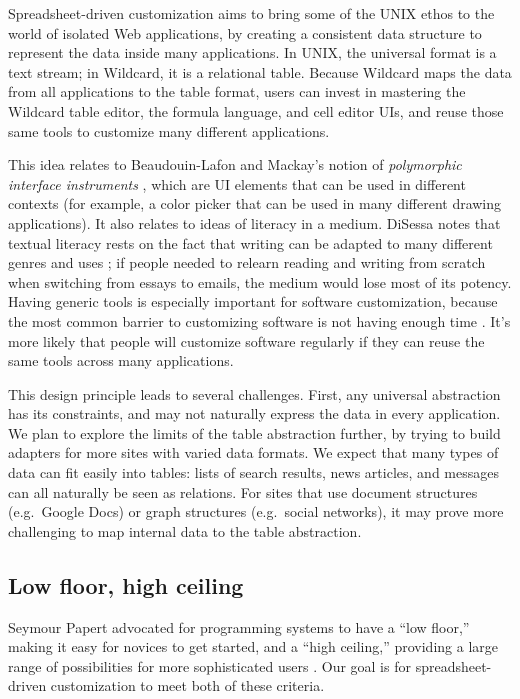 \documentclass[english,submission]{programming}
\begin{document}
Spreadsheet-driven customization aims to bring some of the UNIX ethos to
the world of isolated Web applications, by creating a consistent data
structure to represent the data inside many applications. In UNIX, the
universal format is a text stream; in Wildcard, it is a relational
table. Because Wildcard maps the data from all applications to the table
format, users can invest in mastering the Wildcard table editor, the
formula language, and cell editor UIs, and reuse those same tools to
customize many different applications.

This idea relates to Beaudouin-Lafon and Mackay's notion of
\emph{polymorphic interface instruments} \autocite{beaudouin-lafon2000},
which are UI elements that can be used in different contexts (for
example, a color picker that can be used in many different drawing
applications). It also relates to ideas of literacy in a medium. DiSessa
notes that textual literacy rests on the fact that writing can be
adapted to many different genres and uses \autocite{disessa2000}; if
people needed to relearn reading and writing from scratch when switching
from essays to emails, the medium would lose most of its potency. Having
generic tools is especially important for software customization,
because the most common barrier to customizing software is not having
enough time \autocite{mackay1991}. It's more likely that people will
customize software regularly if they can reuse the same tools across
many applications.

This design principle leads to several challenges. First, any universal
abstraction has its constraints, and may not naturally express the data
in every application. We plan to explore the limits of the table
abstraction further, by trying to build adapters for more sites with
varied data formats. We expect that many types of data can fit easily
into tables: lists of search results, news articles, and messages can
all naturally be seen as relations. For sites that use document
structures (e.g.~Google Docs) or graph structures (e.g.~social
networks), it may prove more challenging to map internal data to the
table abstraction.

\hypertarget{low-floor-high-ceiling}{%
\subsection{Low floor, high ceiling}\label{low-floor-high-ceiling}}

Seymour Papert advocated for programming systems to have a ``low
floor,'' making it easy for novices to get started, and a ``high
ceiling,'' providing a large range of possibilities for more
sophisticated users \autocite{resnick2016}. Our goal is for
spreadsheet-driven customization to meet both of these criteria.
\end{document}
